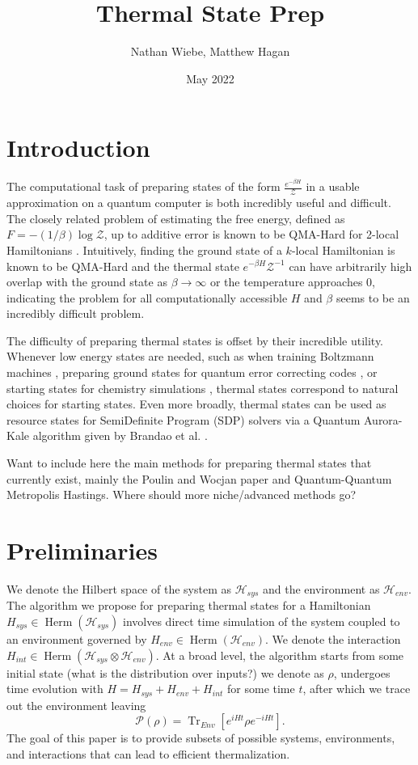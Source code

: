 \documentclass{article}
\title{Thermal State Prep}
\author{Nathan Wiebe, Matthew Hagan}
\date{May 2022}
\newcommand{\parens}[1]{\left( #1 \right)}
\newcommand{\brackets}[1]{\left[ #1 \right]}
\DeclareMathOperator{\Tr}{Tr}
\newcommand{\partrace}[2]{\Tr_{#1} \brackets{ #2 }}
\newcommand{\hilb}{\mathscr{H}}
\newcommand{\partfun}{\mathcal{Z}}
\DeclareMathOperator{\hermMathOp}{Herm}
\newcommand{\herm}[1]{\hermMathOp\parens{#1}}
\begin{document}
\maketitle

\section{Introduction}
The computational task of preparing states of the form $\frac{e^{-\beta H}}{\partfun}$ in a usable approximation on a quantum computer is both incredibly useful and difficult. The closely related problem of estimating the free energy, defined as $F = -(1/\beta) \log \partfun$, up to additive error is known to be QMA-Hard for 2-local Hamiltonians \cite{bravyi_complexity_2021}. Intuitively, finding the ground state of a $k$-local Hamiltonian is known to be QMA-Hard \cite{} and the thermal state $e^{-\beta H} \partfun^{-1}$ can have arbitrarily high overlap with the ground state as $\beta \to \infty$ or the temperature approaches 0, indicating the problem for all computationally accessible $H$ and $\beta$ seems to be an incredibly difficult problem. 

The difficulty of preparing thermal states is offset by their incredible utility. Whenever low energy states are needed, such as when training Boltzmann machines \cite{}, preparing ground states for quantum error correcting codes \cite{}, or starting states for chemistry simulations \cite{}, thermal states correspond to natural choices for starting states. Even more broadly, thermal states can be used as resource states for SemiDefinite Program (SDP) solvers via a Quantum Aurora-Kale algorithm given by Brandao et al. \cite{}. 

Want to include here the main methods for preparing thermal states that currently exist, mainly the Poulin and Wocjan paper and Quantum-Quantum Metropolis Hastings. Where should more niche/advanced methods go?

\section{Preliminaries}
We denote the Hilbert space of the system as $\hilb_{sys}$ and the environment as $\hilb_{env}$. The algorithm we propose for preparing thermal states for a Hamiltonian $H_{sys} \in \herm{\hilb_{sys}}$ involves direct time simulation of the system coupled to an environment governed by $H_{env} \in \herm{\hilb_{env}}$. We denote the interaction $H_{int} \in \herm{\hilb_{sys} \otimes \hilb_{env}}$. At a broad level, the algorithm starts from some initial state (what is the distribution over inputs?) we denote as $\rho$, undergoes time evolution with $H = H_{sys} + H_{env} + H_{int}$ for some time $t$, after which we trace out the environment leaving
\begin{equation}
    \mathcal{P}(\rho) = \partrace{Env}{e^{i H t} \rho e^{-i H t}}.
\end{equation}
The goal of this paper is to provide subsets of possible systems, environments, and interactions that can lead to efficient thermalization. 
\end{document}
